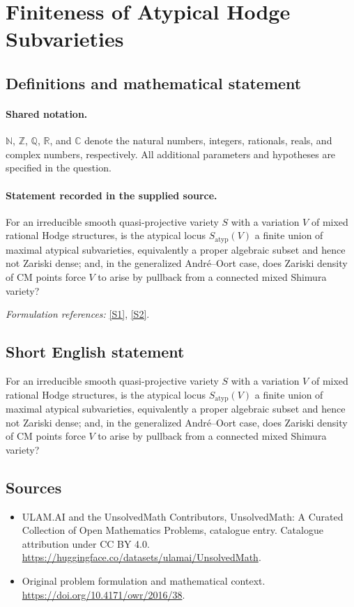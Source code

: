 \documentclass[11pt]{article}
\newcommand{\sref}[2]{\hyperlink{source:#1:#2}{[S#2]}}
\begin{document}
\section{Finiteness of Atypical Hodge Subvarieties}\label{statement}

\subsection{Definitions and mathematical statement}

\paragraph{Shared notation.}$\mathbb N$, $\mathbb Z$, $\mathbb Q$, $\mathbb R$, and $\mathbb C$ denote the natural numbers, integers, rationals, reals, and complex numbers, respectively. All additional parameters and hypotheses are specified in the question.


\paragraph{Statement recorded in the supplied source.}
For an irreducible smooth quasi-projective variety $S$ with a variation $V$ of mixed rational Hodge structures, is the atypical locus $S_{\mathrm{atyp}}(V)$ a finite union of maximal atypical subvarieties, equivalently a proper algebraic subset and hence not Zariski dense; and, in the generalized André–Oort case, does Zariski density of CM points force $V$ to arise by pullback from a connected mixed Shimura variety?
\par\smallskip\textit{Formulation references:} \sref{statement}{1}, \sref{statement}{2}.
\subsection{Short English statement}
For an irreducible smooth quasi-projective variety $S$ with a variation $V$ of mixed rational Hodge structures, is the atypical locus $S_{\mathrm{atyp}}(V)$ a finite union of maximal atypical subvarieties, equivalently a proper algebraic subset and hence not Zariski dense; and, in the generalized André–Oort case, does Zariski density of CM points force $V$ to arise by pullback from a connected mixed Shimura variety?
\subsection{Sources}
\begin{itemize}
\item[\hypertarget{source:statement:1}{S1}] ULAM.AI and the UnsolvedMath Contributors, UnsolvedMath: A Curated Collection of Open Mathematics Problems, catalogue entry. Catalogue attribution under CC BY 4.0.
\url{https://huggingface.co/datasets/ulamai/UnsolvedMath}.
\item[\hypertarget{source:statement:2}{S2}] Original problem formulation and mathematical context.
\url{https://doi.org/10.4171/owr/2016/38}.
\end{itemize}
\label{end:statement}
\end{document}
